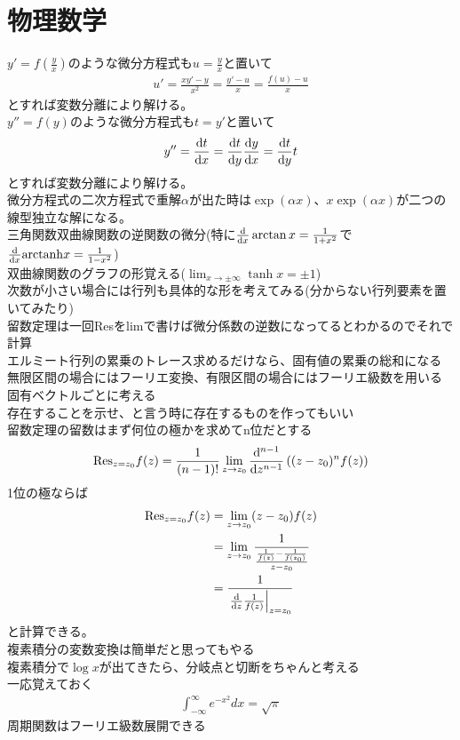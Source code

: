 \documentclass{ltjsarticle}
\begin{document}
  \section{物理数学}
  $y'=f\left( \frac{y}{x} \right) $のような微分方程式も$u=\frac{y}{x}$と置いて
  \begin{align}
    u'=\frac{xy'-y}{x^2}=\frac{y'-u}{x}=\frac{f(u)-u}{x}
  \end{align}
  とすれば変数分離により解ける。\\
  $y''=f(y)$のような微分方程式も$t=y'$と置いて
  \begin{align}
    y''=\dv{t}{x}=\dv{t}{y}\dv{y}{x}=\dv{t}{y}t
  \end{align}
  とすれば変数分離により解ける。\\
  微分方程式の二次方程式で重解$\alpha$が出た時は$\exp\left( \alpha x \right) $、$x \exp\left( \alpha x \right) $が二つの線型独立な解になる。\\
  三角関数双曲線関数の逆関数の微分(特に$\dv{x}\arctan{x}=\frac{1}{1+x^2}$で$\dv{x}\mathrm{arctanh}{x}=\frac{1}{1-x^2}$)\\
  双曲線関数のグラフの形覚える($\lim_{x\to\pm\infty}\tanh{x}=\pm 1$)\\
  次数が小さい場合には行列も具体的な形を考えてみる(分からない行列要素を置いてみたり)\\
  留数定理は一回Resをlimで書けば微分係数の逆数になってるとわかるのでそれで計算\\
  エルミート行列の累乗のトレース求めるだけなら、固有値の累乗の総和になる\\
  無限区間の場合にはフーリエ変換、有限区間の場合にはフーリエ級数を用いる\\
  固有ベクトルごとに考える\\
  存在することを示せ、と言う時に存在するものを作ってもいい\\
  留数定理の留数はまず何位の極かを求めてn位だとする
  \begin{align}
    \mathrm{Res}_{z=z_0}f(z)=\frac{1}{(n-1)!}\lim_{z\to z_0}\dv[n-1]{z}\left((z-z_0)^nf(z)\right)
  \end{align}
  1位の極ならば
  \begin{align}
    \mathrm{Res}_{z=z_0}f(z)&=\lim_{z\to z_0}(z-z_0)f(z)\\
    &=\lim_{z\to z_0}\frac{1}{\frac{\frac{1}{f(z)}-\frac{1}{f(z_0)}}{z-z_0}}\\
    &=\frac{1}{\eval{\dv{z}\frac{1}{f(z)}}_{z=z_0}}\\
  \end{align}
  と計算できる。\\
  複素積分の変数変換は簡単だと思ってもやる\\
  複素積分で$\log{x}$が出てきたら、分岐点と切断をちゃんと考える\\
  一応覚えておく
  \begin{align}
    \int_{-\infty}^{\infty}e^{-x^2}dx=\sqrt{\pi}
  \end{align}
  周期関数はフーリエ級数展開できる\\
\end{document}
